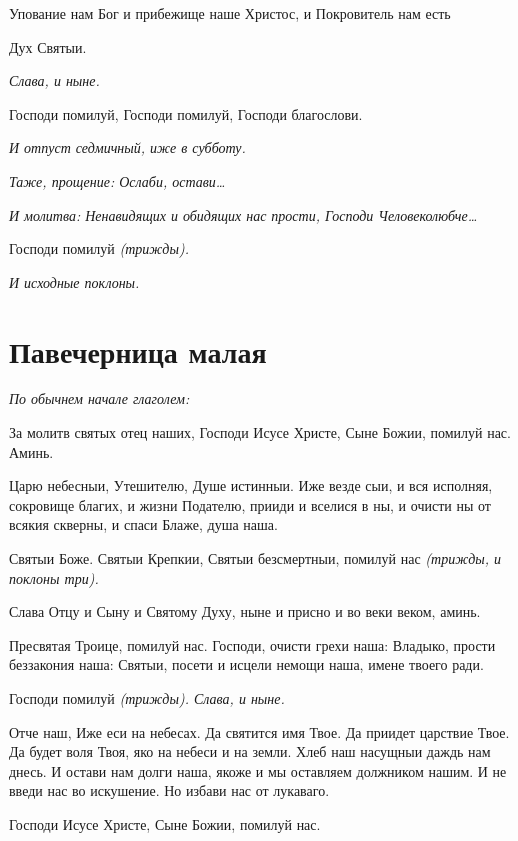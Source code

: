    Упование нам Бог и прибежище наше Христос, и Покровитель нам есть

Дух Святыи.


 \itshape Слава, и ныне\normalfont{}.


   Господи помилуй, Господи помилуй, Господи благослови.


 \itshape И отпуст седмичный, иже в субботу.\normalfont{}


 \itshape Таже, прощение:\normalfont{} Ослаби, остави…


 \itshape И молитва:\normalfont{} Ненавидящих и обидящих нас прости, Господи
Человеколюбче…


   Господи помилуй \itshape (трижды)\normalfont{}.


 \itshape И исходные поклоны.\normalfont{}



\section{Павечерница малая}



\itshape По обычнем начале глаголем:\normalfont{}


   За молитв святых отец наших, Господи Исусе Христе, Сыне Божии,
помилуй нас. Аминь.


   Царю небесныи, Утешителю, Душе истинныи. Иже везде сыи,
и вся исполняя, сокровище благих, и жизни Подателю, прииди и
вселися в ны, и очисти ны от всякия скверны, и спаси Блаже, душа
наша.


   Святыи Боже. Святыи Крепкии, Святыи безсмертныи, помилуй нас
\itshape (трижды, и поклоны три)\normalfont{}.


   Слава Отцу и Сыну и Святому Духу, ныне и присно и во веки веком,
аминь.


   Пресвятая Троице, помилуй нас. Господи, очисти грехи наша: Владыко,
прости беззакония наша: Святыи, посети и исцели немощи наша, имене
твоего ради.


   Господи помилуй \itshape (трижды)\normalfont{}. \itshape Слава, и ныне\normalfont{}.


   Отче наш, Иже еси на небесах. Да святится имя Твое. Да приидет
царствие Твое. Да будет воля Твоя, яко на небеси и на земли. Хлеб наш
насущныи даждь нам днесь. И остави нам долги наша, якоже и мы
оставляем должником нашим. И не введи нас во искушение. Но избави нас от
лукаваго.


   Господи Исусе Христе, Сыне Божии, помилуй нас.


